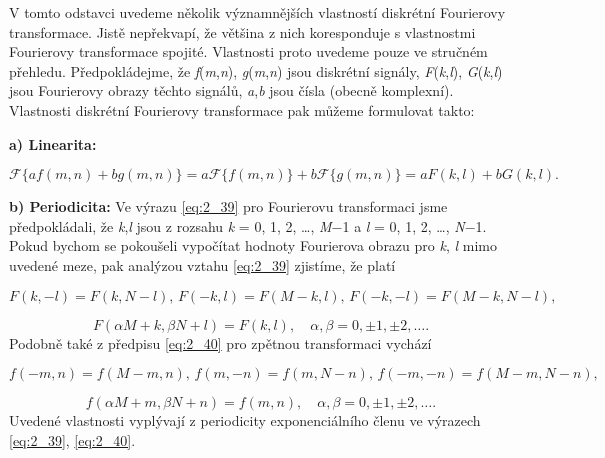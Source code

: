 V tomto odstavci uvedeme několik významnějších vlastností diskrétní Fourierovy transformace. Jistě nepřekvapí, že většina z nich koresponduje s vlastnostmi Fourierovy transformace spojité. Vlastnosti proto uvedeme pouze ve stručném přehledu. Předpokládejme, že \textit{f}(\textit{m},\textit{n}), \textit{g}(\textit{m},\textit{n}) jsou diskrétní signály, \textit{F}(\textit{k},\textit{l}), \textit{G}(\textit{k},\textit{l}) jsou Fourierovy obrazy těchto signálů, \textit{a},\textit{b} jsou čísla (obecně komplexní). Vlastnosti diskrétní Fourierovy transformace pak můžeme formulovat takto:

\noindent \textbf{a) Linearita:}

\begin{equation} \label{eq:2_46}
    \mathscr{F}\{af(m, n) + bg(m, n)\} = a\mathscr{F}\{f(m, n)\} + b\mathscr{F}\{g(m, n)\} = aF(k, l) + bG(k, l).
\end{equation}

\noindent \textbf{b) Periodicita:} Ve výrazu \eqref{eq:2_39} pro Fourierovu transformaci jsme předpokládali, že \textit{k},\textit{l} jsou z rozsahu \textit{k} = 0, 1, 2, \dots, \textit{M}$-$1  a  \textit{l} = 0, 1, 2, \dots, \textit{N}$-$1. Pokud bychom se pokoušeli vypočítat hodnoty Fourierova obrazu pro  \textit{k}, \textit{l}  mimo uvedené meze, pak analýzou vztahu \eqref{eq:2_39} zjistíme, že platí

\begin{equation} \label{eq:2_47}
    F(k, -l) = F(k, N-l), \, F(-k, l) = F(M-k, l), \, F(-k, -l) = F(M-k, N-l),
\end{equation}

\begin{equation} \label{eq:2_48}
    F(\alpha M + k, \beta N + l) = F(k, l), \quad \alpha, \beta = 0, \pm 1, \pm 2, \dots.
\end{equation}
Podobně také z předpisu \eqref{eq:2_40} pro zpětnou transformaci vychází

\begin{equation} \label{eq:2_49}
    f(-m, n) = f(M -m, n), \, f(m, -n) = f(m, N-n), \, f(-m, -n) = f(M-m, N-n),
\end{equation}

\begin{equation} \label{eq:2_50}
    f(\alpha M+m, \beta N+n) = f(m, n), \quad \alpha, \beta = 0, \pm 1, \pm 2, \dots.
\end{equation}
Uvedené vlastnosti vyplývají z periodicity exponenciálního členu ve výrazech \eqref{eq:2_39}, \eqref{eq:2_40}.

